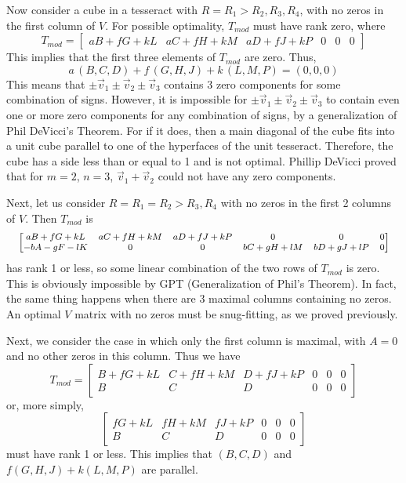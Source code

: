 Now consider a cube in a tesseract with $R = R_1 > R_2, R_3, R_4$, with
no zeros in the first column of $V$. For possible optimality, $T_{mod}$ must
have rank zero, where
\begin{equation*}
T_{mod} =
\begin{bmatrix}
aB\!\!+\!\!fG\!\!+\!\!kL & aC\!\!+\!\!fH\!\!+\!\!kM & aD\!\!+\!\!fJ\!\!+\!\!kP & 0 & 0 & 0
\end{bmatrix}
\end{equation*}
This implies that the first three elements of $T_{mod}$ are zero.  Thus,
\begin{equation*}
a\,(B,C,D) + f\,(G,H,J) + k\,(L,M,P) = (0,0,0)
\end{equation*}
This means that $\pm \vec{v}_1 \pm \vec{v}_2 \pm \vec{v}_3$ contains 3 zero
components for some combination of signs.  However, it is impossible for $\pm
\vec{v}_1 \pm \vec{v}_2 \pm \vec{v}_3$ to contain even one or more zero
components for any combination of signs, by a generalization of Phil DeVicci's
Theorem.  For if it does, then a main diagonal of the cube fits into a unit
cube parallel to one of the hyperfaces of the unit tesseract.  Therefore, the
cube has a side less than or equal to 1 and is not optimal.  Phillip DeVicci
proved that for $m = 2$, $n = 3$, $\vec{v}_1 + \vec{v}_2$ could not have any
zero components.

Next, let us consider $R = R_1 = R_2 > R_3, R_4$ with no zeros in the first 2
columns of $V$.  Then $T_{mod}$ is
\begin{equation*}
\footnotesize
\begin{bmatrix}
 aB+fG+kL &  aC+fH+kM &  aD+fJ+kP &     0     &     0     &     0     \\
-bA-gF-lK &     0     &     0     &  bC+gH+lM &  bD+gJ+lP &     0 
\end{bmatrix}
\normalsize
\end{equation*}
has rank 1 or less, so some linear combination of the two rows of $T_{mod}$ is
zero. This is obviously impossible by GPT (Generalization of Phil's
Theorem). In fact, the same thing happens when there are 3 maximal
columns containing no zeros. An optimal $V$ matrix with no zeros must be
snug-fitting, as we proved previously.

Next, we consider the case in which only the first column is
maximal, with $A = 0$ and no other zeros in this column. Thus we have
\begin{equation*}
T_{mod} =
\begin{bmatrix}
 B\!+\!fG\!+\!kL &  C\!+\!fH\!+\!kM &  D\!+\!fJ\!+\!kP & 0 & 0 & 0 \\
 B               &  C               &  D               & 0 & 0 & 0
\end{bmatrix}
\end{equation*}
or, more simply,
\begin{equation*}
\begin{bmatrix}
 fG\!+\!kL &  fH\!+\!kM &  fJ\!+\!kP & 0 & 0 & 0 \\
 B         &  C         &  D             & 0 & 0 & 0
\end{bmatrix}
\end{equation*}
must have rank 1 or less.  This implies that $(B,C,D)$ and $f(G,H,J)+k(L,M,P)$
are parallel.


